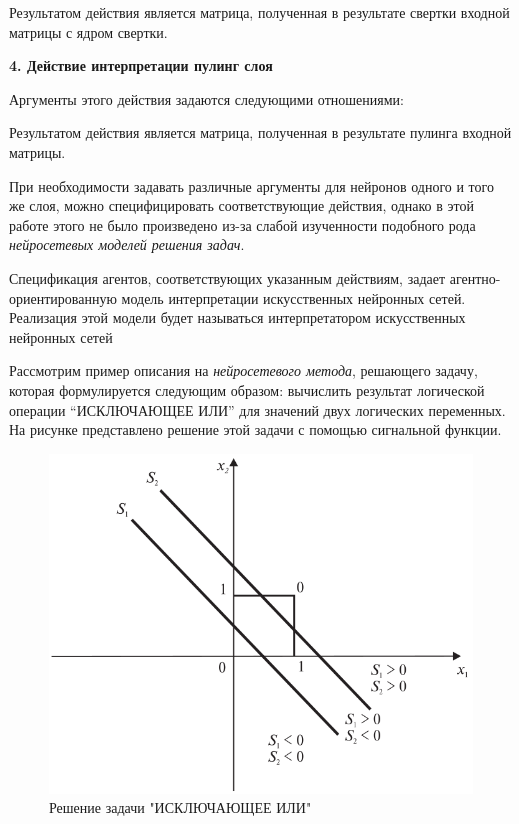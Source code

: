 Результатом действия является матрица, полученная в результате свертки входной матрицы с ядром свертки.


\textbf{4. Действие интерпретации пулинг слоя}

Аргументы этого действия задаются следующими отношениями:
\begin{SCn}



\end{SCn}

Результатом действия является матрица, полученная в результате пулинга входной матрицы.

При необходимости задавать различные аргументы для нейронов одного и того же слоя, можно специфицировать соответствующие действия, однако в этой работе этого не было произведено из-за слабой изученности подобного рода \textit{нейросетевых моделей решения задач}.

Спецификация агентов, соответствующих указанным действиям, задает агентно-ориентированную модель интерпретации искусственных нейронных сетей. Реализация этой модели будет называться интерпретатором искусственных нейронных сетей

Рассмотрим пример описания на \textit{нейросетевого метода}, решающего задачу, которая формулируется следующим образом: вычислить результат логической операции ``ИСКЛЮЧАЮЩЕЕ ИЛИ'' для значений двух логических переменных. На рисунке \textit{} представлено решение этой задачи с помощью сигнальной функции.

\begin{figure}
	\centering
	\includegraphics[width=0.5\linewidth]{author/part3/figures/strong_or_graphic.png}
	\caption{Решение задачи "ИСКЛЮЧАЮЩЕЕ ИЛИ"{}}
	\label{fig:strong_or_graphic}
\end{figure}

